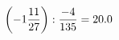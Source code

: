 \documentclass[preview]{standalone}
\begin{document}
\begin{align*}
\left( -1 { 11 \over 27 } \right)  :  { -4 \over 135 } = 20.0
\end{align*}
\end{document}
